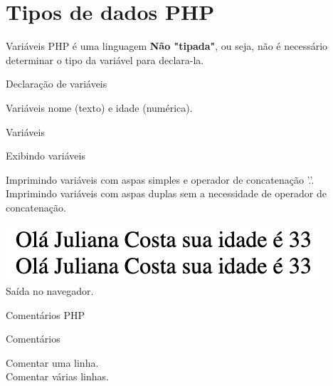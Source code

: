 \documentclass{beamer}
\begin{document}
\section{Tipos de dados PHP}
\begin{frame}{Variáveis}
PHP é uma linguagem \textbf{Não "tipada"}, ou seja, não é necessário determinar o tipo da variável para declara-la.\\
\begin{block}{Declaração de variáveis}
\begin{center}
		
		\tiny Variáveis nome (texto) e idade (numérica).
	\end{center}
\end{block}
\end{frame}
\begin{frame}{Variáveis}
\begin{block}{Exibindo variáveis}
\begin{center}
		
		\tiny Imprimindo variáveis com aspas simples e operador de concatenação '.'.\\
		
		\tiny Imprimindo variáveis com aspas duplas sem a necessidade de operador de concatenação.\\
	\end{center}
\end{block}

	\begin{center}
		  \includegraphics[height=0.1\paperheight]{fig/aula4/php_aula4_3.png} \\
		  \tiny Saída no navegador.
	  \end{center}
	  
\end{frame}
\begin{frame}{Comentários PHP}
\begin{block}{Comentários}
\begin{center}
		
		\tiny Comentar uma linha.\\
		
		\tiny Comentar várias linhas.\\
	\end{center}
\end{block}
\end{frame}
\end{document}
